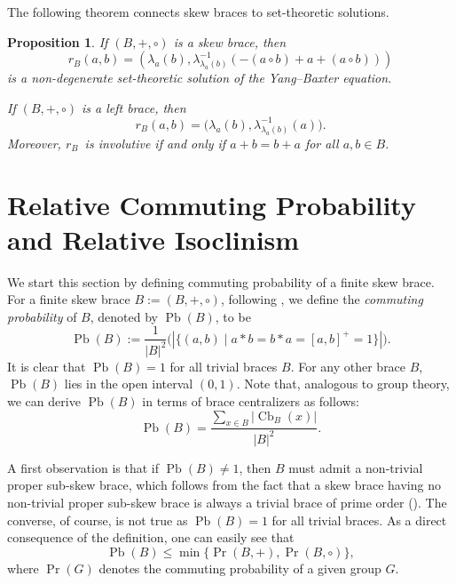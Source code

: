 \documentclass[10pt,a4paper]{amsart}
\numberwithin{equation}{section}
\newtheorem{pro}[equation]{Proposition}
\newcommand{\Cb}{\operatorname{Cb} }
\newcommand{\Pb}{\operatorname{Pb} }
\renewcommand{\Pr}{\operatorname{Pr} }
\begin{document}
The following theorem \cite[Theorem 3.1]{GV17} connects skew braces to set-theoretic solutions.
\begin{pro} %
If $(B, +, \circ)$ is a skew  brace, then
\begin{equation*} %
r_B(a, b) = \left(\lambda_a(b), \lambda^{-1}_{\lambda_a(b)}(-(a \circ b) + a +(a \circ b)) \right)
\end{equation*}
is a non-degenerate set-theoretic solution of the Yang--Baxter equation.

If $(B, +, \circ)$ is a left brace, then
\begin{equation*} %
r_B(a, b) = \big(\lambda_a(b), \lambda^{-1}_{\lambda_a(b)}(a)\big).
\end{equation*}
Moreover, $r_B$~is involutive if and only if $a+b = b+a$ for all $a, b \in B$.
\end{pro}

  
  
  
  
  \section{Relative Commuting Probability and Relative Isoclinism}
  
  
  
  We start this section by defining  commuting probability of a finite skew  brace. For  a finite skew  brace  $B:= (B, +, \circ)$, following \cite{MY26}, we define the  \emph{commuting probability} of $B$, denoted by $\Pb(B)$, to be 
$$\Pb(B)  :=  \frac{1}{ |B|^{2}} \big(|\{(a, b) \mid a * b = b* a = [a, b]^+ = 1\}|\big).$$
It is clear that $\Pb(B) = 1$ for all  trivial braces $B$. For any other brace $B$,  $\Pb(B)$ lies in the open interval $(0, 1)$.
 Note that, analogous to group theory, we can derive $\Pb(B)$ in terms of brace centralizers as follows:
$$\Pb(B) = \frac{\sum_{x\in B}|\Cb_{B}(x)|}{|B|^2}.$$

A first observation is that if  $\Pb(B)  \ne  1$, then $B$ must admit a non-trivial proper sub-skew brace, which follows from the fact that a skew brace having no  non-trivial proper sub-skew brace is always a trivial brace of prime  order (\cite[Theorem A]{BEJP24}). The converse, of course, is not true as $\Pb(B) = 1$ for all trivial  braces. As a direct consequence of the definition, one can easily see that
$$\Pb(B) \leqslant \min\{\Pr(B, +), \Pr(B, \circ)\},$$
where $\Pr(G)$ denotes the commuting probability of a given group $G$.
  
\end{document}
